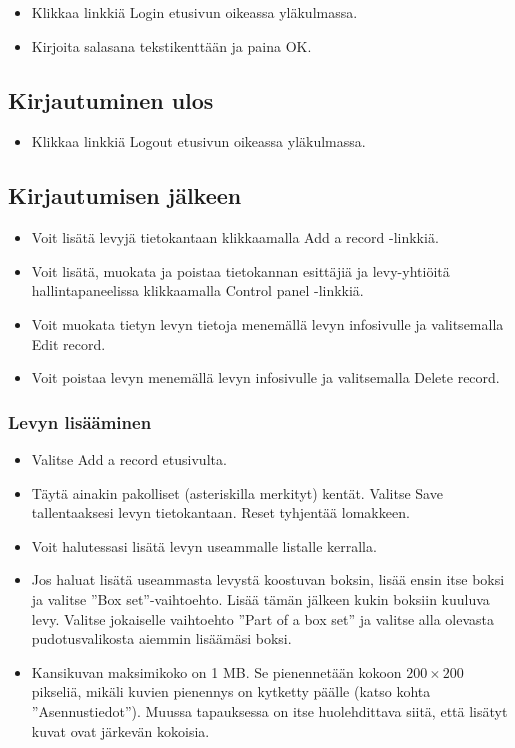 \documentclass[a4paper,12pt]{report}
\begin{document}
\begin{itemize}
  \item Klikkaa linkkiä Login etusivun oikeassa yläkulmassa.
  \item Kirjoita salasana tekstikenttään ja paina OK.
\end{itemize}
	
\subsection{Kirjautuminen ulos}

\begin{itemize}
  \item Klikkaa linkkiä Logout etusivun oikeassa yläkulmassa.
\end{itemize}
	
\subsection{Kirjautumisen jälkeen}

\begin{itemize}
  \item Voit lisätä levyjä tietokantaan klikkaamalla Add a record -linkkiä.
  \item Voit lisätä, muokata ja poistaa tietokannan esittäjiä ja levy-yhtiöitä
    hallintapaneelissa klikkaamalla Control panel -linkkiä.
  \item Voit muokata tietyn levyn tietoja menemällä levyn infosivulle ja
    valitsemalla Edit record.
  \item Voit poistaa levyn menemällä levyn infosivulle ja valitsemalla Delete
    record.
\end{itemize}
	
\subsubsection{Levyn lisääminen}

\begin{itemize}
  \item Valitse Add a record etusivulta.
  \item Täytä ainakin pakolliset (asteriskilla merkityt) kentät. Valitse
    Save tallentaaksesi levyn tietokantaan. Reset tyhjentää lomakkeen.
  \item Voit halutessasi lisätä levyn useammalle listalle kerralla.
  \item Jos haluat lisätä useammasta levystä koostuvan boksin, lisää
    ensin itse boksi ja valitse ''Box set''-vaihtoehto. Lisää tämän
    jälkeen kukin boksiin kuuluva levy. Valitse jokaiselle vaihtoehto
    ''Part of a box set'' ja valitse alla olevasta pudotusvalikosta
    aiemmin lisäämäsi boksi.
  \item Kansikuvan maksimikoko on 1 MB. Se pienennetään kokoon
    $200\times200$ pikseliä, mikäli kuvien pienennys on kytketty päälle
    (katso kohta ''Asennustiedot''). Muussa tapauksessa on itse
    huolehdittava siitä, että lisätyt kuvat ovat järkevän kokoisia.
\end{itemize}
		
\end{document}
